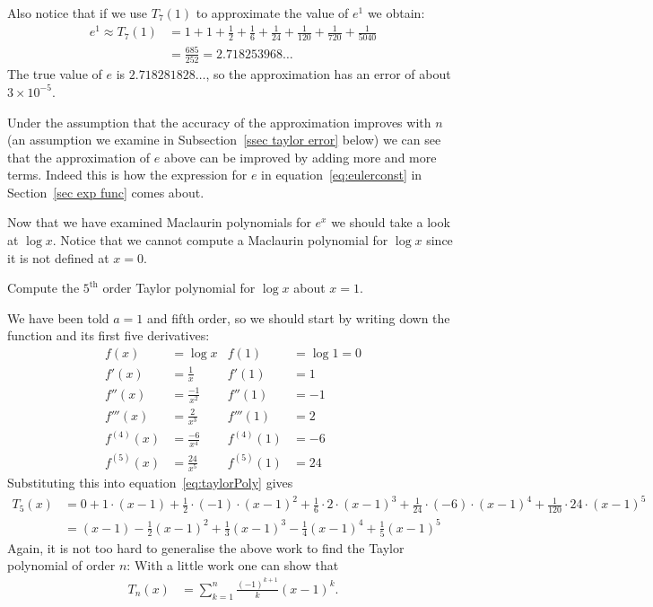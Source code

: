 \begin{eg}
\begin{efig}
\begin{center}
\end{center}
\end{efig}
Also notice that if we use $T_7(1)$ to approximate the value of $e^1$ we obtain:
\begin{align*}
  e^1 \approx T_7(1) &= 1 + 1 + \frac{1}{2} + \frac{1}{6} + \frac{1}{24} + \frac{1}{120}
+ \frac{1}{720} + \frac{1}{5040} \\
  &= \frac{685}{252} =  2.718253968\dots
\end{align*}
The true value of $e$ is $2.718281828\dots$, so the approximation has an error of about
$3\times10^{-5}$.

Under the assumption that the accuracy of the approximation improves with
$n$ (an assumption we examine in Subsection~\ref{ssec taylor error} below) we can see
that the approximation of $e$ above can be improved by adding more and more terms. Indeed
this is how the expression for $e$ in equation~\eqref{eq:eulerconst} in
Section~\ref{sec exp func} comes about.
\end{eg}
Now that we have examined Maclaurin polynomials for $e^x$ we should take a look at $\log
x$. Notice that we cannot compute a Maclaurin polynomial for $\log x$ since it is not
defined at $x=0$.
\begin{eg}\label{eg expand logx}
Compute the $5^\mathrm{th}$ order Taylor polynomial for $\log x$ about $x=1$.

\soln We have been told $a=1$ and fifth order, so we should start by writing down the
function and its first five derivatives:
\begin{align*}
  f(x) &= \log x & f(1) &= \log 1 = 0 \\
  f'(x) &= \frac{1}{x} & f'(1) &= 1 \\
  f''(x) &= \frac{-1}{x^2} & f''(1) &= -1 \\
  f'''(x) &= \frac{2}{x^3} & f'''(1) &= 2 \\
  f^{(4)}(x) &= \frac{-6}{x^4} & f^{(4)}(1) &= -6 \\
  f^{(5)}(x) &= \frac{24}{x^5} & f^{(5)}(1) &= 24
\end{align*}
Substituting this into equation~\eqref{eq:taylorPoly} gives
\begin{align*}
  T_5(x)&= 0 + 1\cdot (x-1)
  + \frac{1}{2} \cdot (-1) \cdot (x-1)^2
  + \frac{1}{6} \cdot 2 \cdot (x-1)^3
  + \frac{1}{24} \cdot (-6) \cdot (x-1)^4
  + \frac{1}{120} \cdot 24 \cdot (x-1)^5 \\
  &= (x-1) - \frac{1}{2}(x-1)^2 + \frac{1}{3}(x-1)^3 - \frac{1}{4}(x-1)^4 +
\frac{1}{5}(x-1)^5
\end{align*}
Again, it is not too hard to generalise the above work to find the Taylor polynomial of
order $n$:
With a little work one can show that
\begin{align*}
  T_n(x) &= \sum_{k=1}^n \frac{(-1)^{k+1}}{k} (x-1)^k.
\end{align*}
\end{eg}
